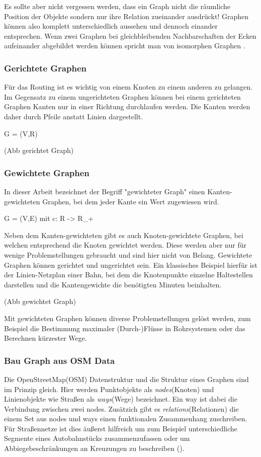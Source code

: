 \documentclass[10pt,a4paper]{article}
\begin{document}
Es sollte aber nicht vergessen werden, dass ein Graph nicht die räumliche Position der Objekte sondern nur ihre Relation zueinander ausdrückt! Graphen können also komplett unterschiedlich aussehen und dennoch einander entsprechen. Wenn zwei Graphen bei gleichbleibenden Nachbarschaften der Ecken aufeinander abgebildet werden können spricht man von isomorphen Graphen \cite[106]{theory}.

\subsubsection{Gerichtete Graphen}
Für das Routing ist es wichtig von einem Knoten zu einem anderen zu gelangen. Im Gegensatz zu einem ungerichteten Graphen können bei einem gerichteten Graphen Kanten nur in einer Richtung durchlaufen werden. Die Kanten werden daher durch Pfeile anstatt Linien dargestellt.

G = (V,R)

(Abb gerichtet Graph)

\subsubsection{Gewichtete Graphen}
In dieser Arbeit bezeichnet der Begriff "gewichteter Graph" einen Kanten-gewichteten Graphen, bei dem jeder Kante ein Wert zugewiesen wird.

G = (V,E) mit c: R -> R_{+}

 Neben dem Kanten-gewichteten gibt es auch Knoten-gewichtete Graphen, bei welchen entsprechend die Knoten gewichtet werden. Diese werden aber nur für wenige Problemstellungen gebraucht und sind hier nicht von Belang. Gewichtete Graphen können gerichtet und ungerichtet sein. Ein klassisches Beispiel hierfür ist der Linien-Netzplan einer Bahn, bei dem die Knotenpunkte einzelne Haltestellen darstellen und die Kantengewichte die benötigten Minuten beinhalten.

(Abb gewichtet Graph)

Mit gewichteten Graphen können diverse Problemstellungen gelöst werden, zum Beispiel die Bestimmung maximaler (Durch-)Flüsse in Rohrsystemen oder das Berechnen kürzester Wege.

\subsubsection{Bau Graph aus OSM Data}

Die OpenStreetMap(OSM) Datenstruktur und die Struktur eines Graphen sind im Prinzip gleich. Hier werden Punktobjekte als \textit{nodes}(Knoten) und Linienobjekte wie Straßen als \textit{ways}(Wege) bezeichnet. Ein way ist dabei die Verbindung zwischen zwei nodes. Zusätzich gibt es \textit{relations}(Relationen) die einem Set aus nodes und ways einen funktionalen Zusammenhang zuschreiben. Für Straßennetze ist dies äußerst hilfreich um zum Beispiel unterschiedliche Segmente eines Autobahnstücks zusammenzufassen oder um Abbiegebeschränkungen an Kreuzungen zu beschreiben (\cite{osmrelation}).
\end{document}
